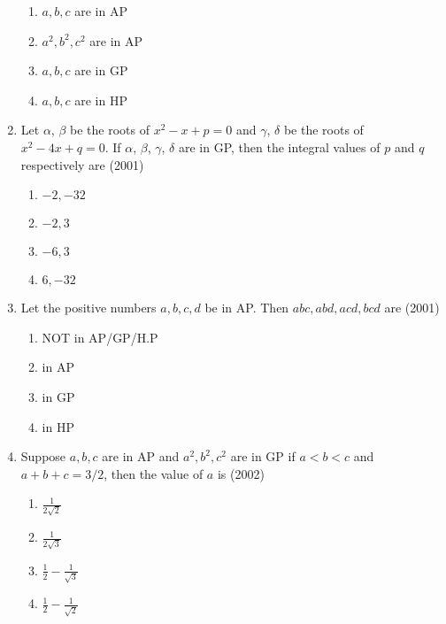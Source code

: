 \begin{enumerate}[label=\thesubsection.\arabic*,ref=\thesubsection.\theenumi]
\begin{multicols}{2}
%        
\begin{enumerate}    
        \item $a, b, c$ are in AP
        \item $a^2, b^2, c^2$ are in AP
        \item $a, b, c$ are in GP
        \item $a, b, c$ are in HP
    \end{enumerate}
    \end{multicols}
\item Let $\alpha$, $\beta$ be the roots of $x^2-x+p=0$ and $\gamma$, $\delta$ be the roots of $x^2-4x+q=0$. If $\alpha$, $\beta$, $\gamma$, $\delta$ are in GP, then the integral values of $p$ and $q$ respectively are \hfill(2001)
            \begin{multicols}{4}
\begin{enumerate}    
                \item $-2, -32$
                \item $-2, 3$
                \item $-6, 3$
                \item $6, -32$
%        
    \end{enumerate}
    \end{multicols}
\item Let the positive numbers $a, b, c, d$ be in AP. Then $abc, abd, acd, bcd$ are \hfill(2001)
    \begin{multicols}{2}
\begin{enumerate}    
        \item NOT in AP/GP/H.P
        \item in AP
        \item in GP
        \item  in HP
        \end{enumerate}
\end{multicols}
\item Suppose $a, b, c$ are in AP and $a^2, b^2, c^2$ are in GP if $a<b<c$ and $a+b+c=3/2$,  then the value of $a$ is \hfill(2002)
            \begin{multicols}{4}
\begin{enumerate}    
             \item $\frac{1}{2\sqrt{2}}$
             \item $\frac{1}{2\sqrt{3}}$
             \item $\frac{1}{2}-\frac{1}{\sqrt{3}}$
             \item $\frac{1}{2}-\frac{1}{\sqrt{2}}$

\end{enumerate}
\end{multicols}
\end{enumerate}
